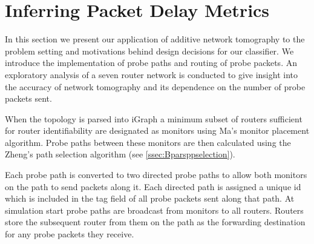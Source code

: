 \section{Inferring Packet Delay Metrics}
\label{sec:Mnetworkprobing}
In this section we present our application of additive network tomography to the problem setting and motivations behind design decisions for our classifier. We introduce the implementation of probe paths and routing of probe packets. An exploratory analysis of a seven router network is conducted to give insight into the accuracy of network tomography and its dependence on the number of probe packets sent.\par
When the topology is parsed into iGraph a minimum subset of routers sufficient for router identifiability are designated as monitors using Ma's monitor placement algorithm. Probe paths between these monitors are then calculated using the Zheng's path selection algorithm (see \cref{ssec:Bparsppselection}).\par
Each probe path is converted to two directed probe paths to allow both monitors on the path to send packets along it. Each directed path is assigned a unique id which is included in the tag field of all probe packets sent along that path. At simulation start probe paths are broadcast from monitors to all routers. Routers store the subsequent router from them on the path as the forwarding destination for any probe packets they receive.\par
